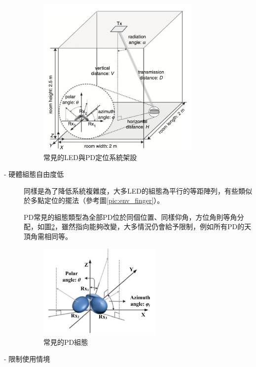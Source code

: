 \begin{description}
        
        \begin{figure}[ht]
            \centering
            \includegraphics[width=8cm]{ch2pic/case_parallel.png}
            \caption{常見的LED與PD定位系統架設\cite{case:aoa}}
            \label{pic:case_parallel}
        \end{figure}

        \item[- 硬體組態自由度低]\hfill 
        
        \qquad
        同樣是為了降低系統複雜度，大多LED的組態為平行的等距陣列，有些類似於多點定位的擺法（參考圖\ref{pic:env_finger}）。

        \qquad
        PD常見的組態類型\cite{case:cart2d}\cite{case:cart3d}\cite{case:3d_layers}為全部PD位於同個位置、同樣仰角，方位角則等角分配，如圖\ref{pic:config_orient}，雖然指向能夠改變，大多情況仍會給予限制，例如所有PD的天頂角需相同等。

        \begin{figure}[ht]
            \centering
            \includegraphics[width=6cm]{ch2pic/config_orient.png}
            \caption{常見的PD組態\cite{case:3d_layers}}
            \label{pic:config_orient}
        \end{figure}
        
        \item[- 限制使用情境]\hfill 
        

\end{description}
